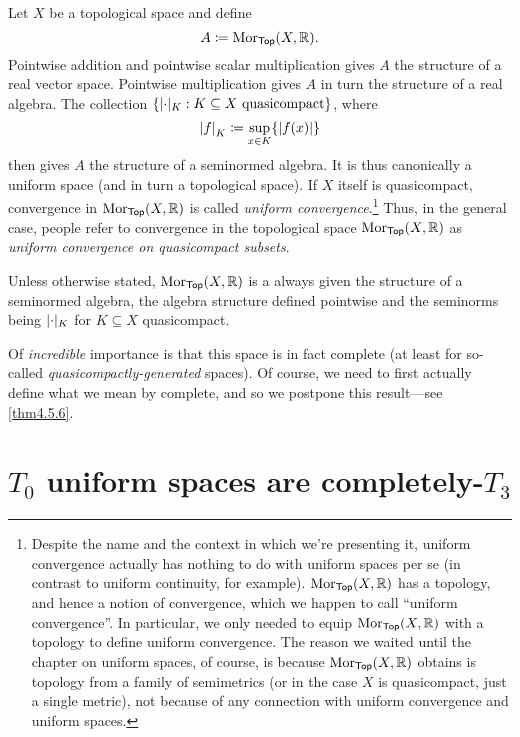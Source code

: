 \begin{exm}\label{exm4.3.60}
Let $X$ be a topological space and define
\begin{equation}
A\coloneqq \operatorname{Mor} _{\mathsf{Top}}(X,\mathbb{R} ).
\end{equation}
Pointwise addition and pointwise scalar multiplication gives $A$ the structure of a real vector space.  Pointwise multiplication gives $A$ in turn the structure of a real algebra.  The collection $\{ \norm _K:K\subseteq X\text{ quasicompact}\}$, where
\begin{equation}
\norm[f]_K\coloneqq \sup _{x\in K}\{ \abs{f(x)}\} 
\end{equation}
then gives $A$ the structure of a seminormed algebra.  It is thus canonically a uniform space (and in turn a topological space).  If $X$ itself is quasicompact, convergence in $\operatorname{Mor} _{\mathsf{Top}}(X,\mathbb{R} )$ is called \emph{uniform convergence}.\footnote{Despite the name and the context in which we're presenting it, uniform convergence actually has nothing to do with uniform spaces per se (in contrast to uniform continuity, for example).  $\operatorname{Mor} _{\mathsf{Top}}(X,\mathbb{R} )$ has a topology, and hence a notion of convergence, which we happen to call ``uniform convergence''.  In particular, we only needed to equip $\operatorname{Mor} _{\mathsf{Top}}(X,\mathbb{R} )$ with a topology to define uniform convergence.  The reason we waited until the chapter on uniform spaces, of course, is because $\operatorname{Mor} _{\mathsf{Top}}(X,\mathbb{R} )$ obtains is topology from a family of semimetrics (or in the case $X$ is quasicompact, just a single metric), not because of any connection with uniform convergence and uniform spaces.}  Thus, in the general case, people refer to convergence in the topological space $\operatorname{Mor} _{\mathsf{Top}}(X,\mathbb{R} )$ as \emph{uniform convergence on quasicompact subsets}.
\begin{textequation}
Unless otherwise stated, $\operatorname{Mor} _{\mathsf{Top}}(X,\mathbb{R} )$ is a always given the structure of a seminormed algebra, the algebra structure defined pointwise and the seminorms being $\norm _K$ for $K\subseteq X$ quasicompact.
\end{textequation}

Of \emph{incredible} importance is that this space is in fact complete (at least for so-called \emph{quasicompactly-generated} spaces).  Of course, we need to first actually define what we mean by complete, and so we postpone this result---see \cref{thm4.5.6}.
\end{exm}

\section{$T_0$ uniform spaces are completely-$T_3$}

